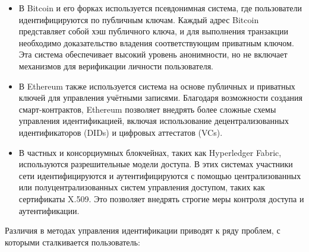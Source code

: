 \begin{itemize}
	\item В Bitcoin и его форках используется псевдонимная система, где пользователи идентифицируются по публичным ключам. Каждый адрес Bitcoin представляет собой хэш публичного ключа, и для выполнения транзакции необходимо доказательство владения соответствующим приватным ключом. Эта система обеспечивает высокий уровень анонимности, но не включает механизмов для верификации личности пользователя.

	\item В Ethereum также используется система на основе публичных и приватных ключей для управления учётными записями. Благодаря возможности создания смарт-контрактов, Ethereum позволяет внедрять более сложные схемы управления идентификацией, включая использование децентрализованных идентификаторов (DIDs) и цифровых аттестатов (VCs).

	\item В частных и консорциумных блокчейнах, таких как Hyperledger Fabric, используются разрешительные модели доступа. В этих системах участники сети идентифицируются и аутентифицируются с помощью централизованных или полуцентрализованных систем управления доступом, таких как сертификаты X.509. Это позволяет внедрять строгие меры контроля доступа и аутентификации.
\end{itemize}

Различия в методах управления идентификации приводят к ряду проблем, с которыми сталкивается пользователь:


